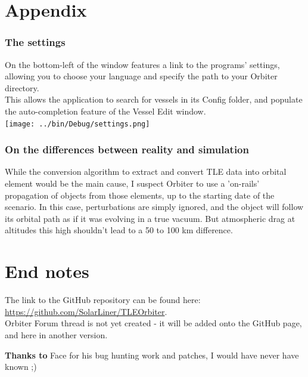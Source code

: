 \documentclass[a4paper]{article}
\begin{document}
	\newpage
	\part{Appendix}
		\section{The settings}
			On the bottom-left of the window features a link to the programs' settings, allowing you to choose your language and specify the path to your Orbiter directory.\\
			This allows the application to search for vessels in its Config folder, and populate the auto-completion feature of the Vessel Edit window.\\
			\texttt{[image: ../bin/Debug/settings.png]} 
			
		\section{On the differences between reality and simulation}
			While the conversion algorithm to extract and convert TLE data into orbital element would be the main cause, I suspect Orbiter to use a 'on-rails' propagation of objects from those elements, up to the starting date of the scenario. In this case, perturbations are simply ignored, and the object will follow its orbital path as if it was evolving in a true vacuum. But atmospheric drag at altitudes this high shouldn't lead to a 50 to 100 km difference.
			
	\newpage
	\part{End notes}
		The link to the GitHub repository can be found here: \url{https://github.com/SolarLiner/TLEOrbiter}.\\
		Orbiter Forum thread is not yet created - it will be added onto the GitHub page, and here in another version.
		
		\textbf{Thanks to} Face for his bug hunting work and patches, I would have never have known ;)
\end{document}
